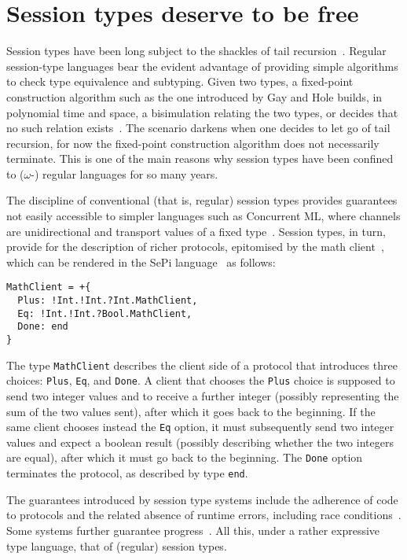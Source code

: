 \section{Session types deserve to be free}

Session types have been long subject to the shackles of tail
recursion~\cite{DBLP:conf/concur/Honda93,DBLP:conf/esop/HondaVK98}. Regular
session-type languages bear the evident advantage of providing simple
algorithms to check type equivalence and subtyping. Given two types, a
fixed-point construction algorithm such as the one introduced by Gay
and Hole builds, in polynomial time and space, a bisimulation relating
the two types, or decides that no such relation
exists~\cite{DBLP:journals/acta/GayH05}. The scenario darkens when one
decides to let go of tail recursion, for now the fixed-point
construction algorithm does not necessarily terminate.
%
This is one of the main reasons why session types have been confined
to ($\omega$-) regular languages for so many years.

The discipline of conventional (that is, regular) session types
provides guarantees not easily accessible to simpler languages such as
Concurrent ML, where channels are unidirectional and transport values
of a fixed type~\cite{DBLP:conf/mcmaster/Reppy93}. Session types, in
turn, provide for the description of richer protocols, epitomised by
the math client~\cite{DBLP:journals/acta/GayH05}, which can be
rendered in the SePi language~\cite{DBLP:conf/sefm/FrancoV13} as
follows:
%
\begin{lstlisting}[morekeywords=end]
MathClient = +{
  Plus: !Int.!Int.?Int.MathClient,
  Eq: !Int.!Int.?Bool.MathClient,
  Done: end
}
\end{lstlisting}

The type \lstinline|MathClient| describes the client side of a
protocol that introduces three choices: \lstinline|Plus|,
\lstinline|Eq|, and \lstinline|Done|. A client that chooses the
\lstinline|Plus| choice is supposed to send two integer values and to
receive a further integer (possibly representing the sum of the two
values sent), after which it goes back to the beginning. If the same
client chooses instead the \lstinline|Eq| option, it must subsequently
send two integer values and expect a boolean result (possibly
describing whether the two integers are equal), after which it must go
back to the beginning.  The \lstinline|Done| option terminates the
protocol, as described by type \lstinline[morekeywords=end]|end|.

The guarantees introduced by session type systems include the
adherence of code to protocols and the related absence of runtime
errors, including race
conditions~\cite{DBLP:conf/esop/HondaVK98}. Some systems further
guarantee progress~\cite{DBLP:conf/concur/CairesP10}. All this, under
a rather expressive type language, that of (regular) session types.


